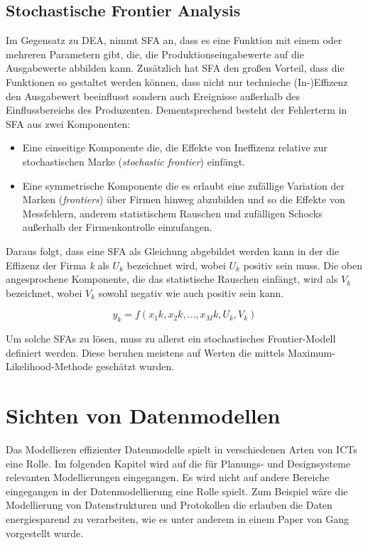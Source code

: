 \subsection{Stochastische Frontier Analysis}
Im Gegensatz zu DEA, nimmt SFA an, dass es eine Funktion mit einem oder mehreren Parametern gibt, die, die Produktionseingabewerte auf die Ausgabewerte abbilden kann. Zusätzlich hat SFA den großen Vorteil, dass die Funktionen so gestaltet werden können, dass nicht nur technische (In-)Effizenz den Ausgabewert beeinflusst sondern auch Ereignisse außerhalb des Einflussbereichs des Produzenten. Dementsprechend besteht der Fehlerterm in SFA aus zwei Komponenten:
\begin{itemize}
	\item Eine einseitige Komponente die, die Effekte von Ineffizenz relative zur stochastischen Marke (\textit{stochastic frontier}) einfängt.
	\item Eine symmetrische Komponente die es erlaubt eine zufällige Variation der Marken (\textit{frontiers}) über Firmen hinweg abzubilden und so die Effekte von Messfehlern, anderem statistischem Rauschen und zufälligen Schocks außerhalb der Firmenkontrolle einzufangen.
\end{itemize}

Daraus folgt, dass eine SFA als Gleichung abgebildet werden kann in der die Effizenz der Firma \textit{k} als $U_k$ bezeichnet wird, wobei $U_k$ positiv sein muss. Die oben angesprochene Komponente, die das statistische Rauschen einfängt, wird als $V_k$ bezeichnet, wobei $V_k$ sowohl negativ wie auch positiv sein kann.\cite{jour:Cullinane2006}

\begin{equation}\label{eq:sfadef}
	y_k = f(x_1k,x_2k,...,x_Mk,U_k,V_k)
\end{equation}

Um solche SFAs zu lösen, muss zu allerst ein stochastisches Frontier-Modell definiert werden. Diese beruhen meistens auf Werten die mittels Maximum-Likelihood-Methode geschätzt wurden.

\section{Sichten von Datenmodellen}
Das Modellieren effizienter Datenmodelle spielt in verschiedenen Arten von ICTs eine Rolle. Im folgenden Kapitel wird auf die für Planungs- und Designsysteme relevanten Modellierungen eingegangen. Es wird nicht auf andere Bereiche eingegangen in der Datenmodellierung eine Rolle spielt. Zum Beispiel wäre die Modellierung von Datenstrukturen und Protokollen die erlauben die Daten energiesparend zu verarbeiten, wie es unter anderem in einem Paper von Gang\cite{jour:Lu2007} vorgestellt wurde.


